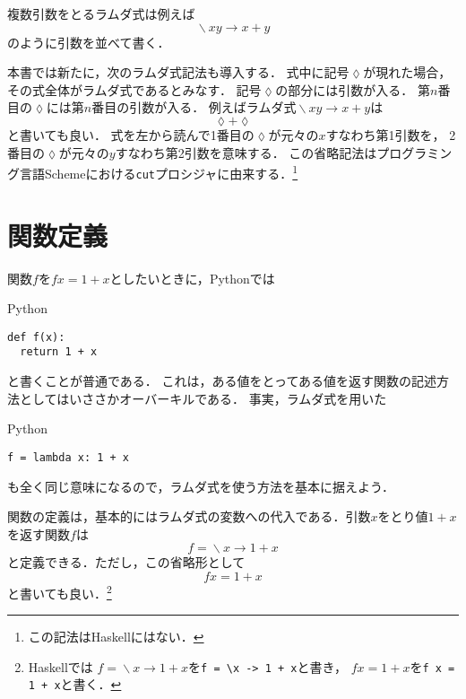 \documentclass[a5paper,draft]{jsbook}
\newcommand{\programminglanguage}[1]{\textsf{#1}}
\newcommand{\haskell}{\programminglanguage{Haskell}}
\newcommand{\python}{\programminglanguage{Python}}
\newcommand{\scheme}{\programminglanguage{Scheme}}
\newcommand{\code}[1]{\texttt{#1}}
\newenvironment{pythoncode}{\begin{itembox}[r]{\python}}{\end{itembox}}
\newcommand{\pthnId}[1]{\textit{#1}}
\newcommand{\pthnKeyword}[1]{\textbf{#1}}
\newcommand{\pthnOp}[1]{\texttt{#1}}
\newcommand{\mathAnonymousParameter}{\lozenge}
\newcommand{\mathUnaryOperator}[1]{\operatorname{#1}}
\newcommand{\mathLambda}{\mathUnaryOperator{\backslash}}
\newcommand{\mathLambdaArrow}{\rightarrow}
\newcommand{\mathLambdaExpression}[2]{\mathLambda#1\mathLambdaArrow#2}
\begin{document}
複数引数をとるラムダ式は例えば
\begin{equation}
\mathLambdaExpression{xy}{x+y}
\end{equation}
のように引数を並べて書く．

本書では新たに，次のラムダ式記法も導入する．
式中に記号$\mathAnonymousParameter$が現れた場合，
その式全体がラムダ式であるとみなす．
記号$\mathAnonymousParameter$の部分には引数が入る．
第$n$番目の$\mathAnonymousParameter$には第$n$番目の引数が入る．
例えばラムダ式$\mathLambdaExpression{xy}{x+y}$は
\begin{equation}
\mathAnonymousParameter+\mathAnonymousParameter
\end{equation}
と書いても良い．
式を左から読んで1番目の$\mathAnonymousParameter$が元々の$x$すなわち第1引数を，
2番目の$\mathAnonymousParameter$が元々の$y$すなわち第2引数を意味する．
この省略記法はプログラミング言語\scheme における\code{cut}プロシジャに由来する．\footnote{この記法は\haskell にはない．}


\section{関数定義}

関数$f$を$fx=1+x$としたいときに，\python では
\begin{pythoncode}
\begin{verbatim}
def f(x):
  return 1 + x
\end{verbatim}
\end{pythoncode}
と書くことが普通である．
これは，ある値をとってある値を返す関数の記述方法としてはいささかオーバーキルである．
事実，ラムダ式を用いた
\begin{pythoncode}
\begin{verbatim}
f = lambda x: 1 + x
\end{verbatim}
\end{pythoncode}
も全く同じ意味になるので，ラムダ式を使う方法を基本に据えよう．

関数の定義は，基本的にはラムダ式の変数への代入である．引数$x$をとり値$1+x$を返す関数$f$は
\begin{equation}
f=\mathLambdaExpression{x}{1+x}
\end{equation}
と定義できる．ただし，この省略形として
\begin{equation}
fx=1+x
\end{equation}
と書いても良い．\footnote{\haskell では
$f=\mathLambdaExpression{x}{1+x}$を\code{f = \textbackslash x -> 1 + x}と書き，
$fx=1+x$を\code{f x = 1 + x}と書く．}
\end{document}
